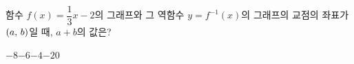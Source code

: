 \hspace*{2mm}\begin{minipage}[t]{\dimexpr\linewidth-2mm\relax}\vspace{0pt}
함수 $f(x)=\dfrac{1}{3}x-2$의 그래프와 그 역함수 $y=f^{-1}(x)$의 그래프의 교점의 좌표가 $(a,\mkern3mu b)$일 때, $a+b$의 값은?
\begin{choices32}{$-8$}{$-6$}{$-4$}{$-2$}{$0$}\end{choices32}\end{minipage}
